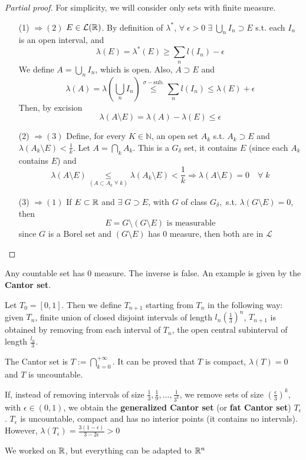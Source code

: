 \begin{proof}[Partial proof]
    For simplicity, we will consider only sets with finite measure.
    \begin{itemize}
        \item[(1)]\( \Rightarrow (2)\) \(E \in \mathcal{L}(\mathbb{R})\). By definition of \(\lambda^*\), \(\forall \; \epsilon > 0 \; \exists \; \bigcup_n I_n \supset E\) s.t. each \(I_n\) is an open interval, and 
        \[
            \lambda(E) = \lambda^*(E) \geq \sum_n l(I_n) -\epsilon
        \]
        We define \(A = \bigcup_n I_n\), which is open. Also, \(A \supset E\) and 
        \[
            \lambda(A)= \lambda\left(\bigcup_n I_n\right) \overset{\sigma-\mbox{sub.}}{\leq} \sum_n l(I_n) \leq \lambda(E) + \epsilon
        \]
        Then, by excision
        \[
            \lambda(A \setminus E) = \lambda(A) - \lambda(E) \leq \epsilon
        \]
        \item[(2)]\( \Rightarrow (3)\) Define, for every \(K \in \mathbb{N}\), an open set \(A_k\) s.t. \(A_k \supset E\) and \(\lambda(A_k \setminus E) < \frac{1}{k}\). Let \(A = \bigcap_k A_k\). This is a \(G_{\delta}\) set, it contains \(E\) (since each \(A_k\) contains \(E\)) and 
        \[
            \lambda(A \setminus E) \underset{(A \subset A_k \; \forall \; k)}{\leq} \lambda(A_k \setminus E) < \frac{1}{k} \Rightarrow \lambda(A \setminus E) = 0 \quad \forall \; k
        \]
        \item[(3)]\( \Rightarrow (1)\) If \(E \subset \mathbb{R}\) and \(\exists\; G \supset E\), with \(G\) of class \(G_{\delta},\) s.t. \(\lambda(G \setminus E) = 0\), then
        \[
            E = G \setminus(G \setminus E) \mbox{ is measurable}
        \]
        since \(G\) is a Borel set and \((G \setminus E)\) has \(0\) measure, then both are in \(\mathcal{L}\)
    \end{itemize}
\end{proof}
\begin{remark}
    Any countable set has \(0\) measure. The inverse is false. An example is given by the \textbf{Cantor set}.
    
    Let \(T_0 = [0,1]\). Then we define \(T_{n+1}\) starting from \(T_n\) in the following way:
    given \(T_n\), finite union of closed disjoint intervals of length \(l_n (\frac{1}{3})^n\), \(T_{n+1}\) is obtained by removing from each interval of \(T_n\), the open central subinterval of length \(\frac{l_n}{3}\).

    The Cantor set is \(T := \bigcap_{k=0}^{+\infty}\). It can be proved that \(T\) is compact, \(\lambda(T) = 0\) and \(T\) is uncountable.

    If, instead of removing intervals of size \(\frac{1}{3}, \frac{1}{9}, \ldots, \frac{1}{3^k}\), we remove sets of size \(\left(\frac{\epsilon}{3}\right)^k\), with \(\epsilon \in (0,1)\), we obtain the \textbf{generalized Cantor set} (or \textbf{fat Cantor set}) \(T_{\epsilon}\). \(T_{\epsilon}\) is uncountable, compact and has no interior points (it contains no intervals). However, \(\lambda(T_{\epsilon}) = \frac{3(1 -\epsilon)}{3 - 2\epsilon} > 0\)
\end{remark}
\begin{remark}
    We worked on \(\mathbb{R}\), but everything can be adapted to \(\mathbb{R}^n\)
\end{remark}
